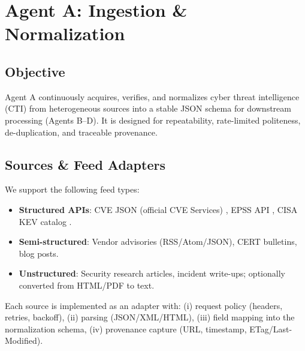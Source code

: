 \section{Agent A: Ingestion \& Normalization}
\label{sec:agentA}

\subsection{Objective}
Agent A continuously acquires, verifies, and normalizes cyber threat intelligence (CTI) from heterogeneous sources into a stable JSON schema for downstream processing (Agents B--D). It is designed for repeatability, rate-limited politeness, de-duplication, and traceable provenance.

\subsection{Sources \& Feed Adapters}
We support the following feed types:
\begin{itemize}
  \item \textbf{Structured APIs}: CVE JSON (official CVE Services) \cite{cve_reference}, EPSS API \cite{epss_reference}, CISA KEV catalog \cite{cisa_kev}.
  \item \textbf{Semi-structured}: Vendor advisories (RSS/Atom/JSON), CERT bulletins, blog posts.
  \item \textbf{Unstructured}: Security research articles, incident write-ups; optionally converted from HTML/PDF to text.
\end{itemize}
Each source is implemented as an adapter with: (i) request policy (headers, retries, backoff), (ii) parsing (JSON/XML/HTML), (iii) field mapping into the normalization schema, (iv) provenance capture (URL, timestamp, ETag/Last-Modified).


